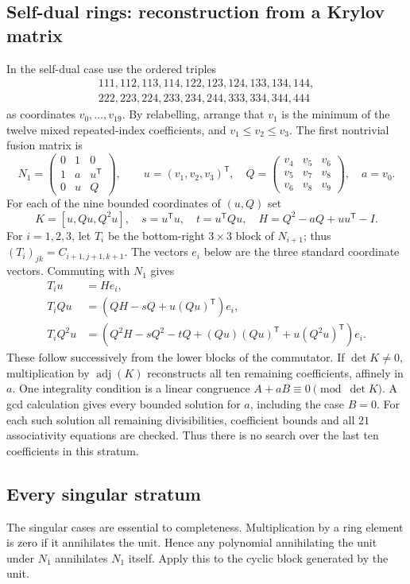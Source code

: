 \documentclass[11pt,a4paper]{article}
\theoremstyle{definition}\newtheorem{definition}[theorem]{Definition}\newtheorem{remark}[theorem]{Remark}
\begin{document}
\subsection{Self-dual rings: reconstruction from a Krylov matrix}
In the self-dual case use the ordered triples
\[
\begin{gathered}111,112,113,114,122,123,124,133,134,144,\\
222,223,224,233,234,244,333,334,344,444\end{gathered}
\]
as coordinates $v_0,\ldots,v_{19}$. By relabelling, arrange that
$v_1$ is the minimum of the twelve mixed repeated-index coefficients,
and $v_1\leq v_2\leq v_3$. The first nontrivial fusion matrix is
\[
N_1=\begin{pmatrix}0&1&0\\1&a&u^{\mathsf T}\\0&u&Q\end{pmatrix},\qquad
u=(v_1,v_2,v_3)^{\mathsf T},\quad
Q=\begin{pmatrix}v_4&v_5&v_6\\v_5&v_7&v_8\\v_6&v_8&v_9\end{pmatrix},
\quad a=v_0.
\]
For each of the nine bounded coordinates of $(u,Q)$ set
\[
K=[u,Qu,Q^2u],\quad s=u^{\mathsf T}u,\quad t=u^{\mathsf T}Qu,
\quad H=Q^2-aQ+uu^{\mathsf T}-I.
\]
For $i=1,2,3$, let $T_i$ be the bottom-right $3\times3$ block
of $N_{i+1}$; thus $(T_i)_{jk}=C_{i+1,j+1,k+1}$.
The vectors $e_i$ below are the three standard coordinate vectors.
Commuting with $N_1$ gives
\begin{align}
T_i u&=He_i,\label{eq:krylov}\\
T_i Qu&=(QH-sQ+u(Qu)^{\mathsf T})e_i,\nonumber\\
T_i Q^2u&=(Q^2H-sQ^2-tQ+(Qu)(Qu)^{\mathsf T}
                       +u(Q^2u)^{\mathsf T})e_i.\nonumber
\end{align}
These follow successively from the lower blocks of the commutator.
If $\det K\ne0$, multiplication by $\operatorname{adj}(K)$ reconstructs
all ten remaining coefficients, affinely in $a$. One integrality
condition is a linear congruence $A+aB\equiv0\pmod{\det K}$.
A gcd calculation gives every bounded solution for $a$, including the
case $B=0$. For each such solution all remaining divisibilities,
coefficient bounds and all $21$ associativity equations are checked.
Thus there is no search over the last ten coefficients in this stratum.

\subsection{Every singular stratum}
The singular cases are essential to completeness. Multiplication by a
ring element is zero if it annihilates the unit. Hence any polynomial
annihilating the unit under $N_1$ annihilates $N_1$ itself. Apply this to
the cyclic block generated by the unit.
\end{document}
